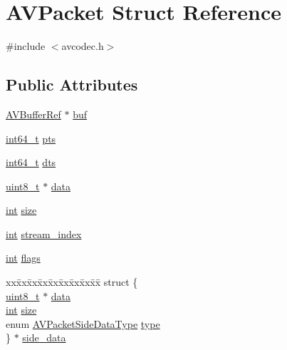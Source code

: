 \hypertarget{struct_a_v_packet}{}\section{A\+V\+Packet Struct Reference}
\label{struct_a_v_packet}


{\ttfamily \#include $<$avcodec.\+h$>$}

\subsection*{Public Attributes}
\begin{DoxyCompactItemize}
\item 
\hyperlink{struct_a_v_buffer_ref}{A\+V\+Buffer\+Ref} $\ast$ \hyperlink{struct_a_v_packet_a3bf81872813551fe9343dd0e09993e38}{buf}
\item 
\hyperlink{lib-src_2ffmpeg_2win32_2stdint_8h_a67a9885ef4908cb72ce26d75b694386c}{int64\+\_\+t} \hyperlink{struct_a_v_packet_a73bde0a37f3b1efc839f11295bfbf42a}{pts}
\item 
\hyperlink{lib-src_2ffmpeg_2win32_2stdint_8h_a67a9885ef4908cb72ce26d75b694386c}{int64\+\_\+t} \hyperlink{struct_a_v_packet_a85dbbd306b44b02390cd91c45e6a0f76}{dts}
\item 
\hyperlink{lib-src_2ffmpeg_2win32_2stdint_8h_a9a941819355e6f658991890ff66b4b0e}{uint8\+\_\+t} $\ast$ \hyperlink{struct_a_v_packet_aaf4fe58dfcc7c232c1f2268b539d8367}{data}
\item 
\hyperlink{xmltok_8h_a5a0d4a5641ce434f1d23533f2b2e6653}{int} \hyperlink{struct_a_v_packet_a4d1ea19f63eb107111fd650ca514d1f4}{size}
\item 
\hyperlink{xmltok_8h_a5a0d4a5641ce434f1d23533f2b2e6653}{int} \hyperlink{struct_a_v_packet_a0d1cb9b5a32b00fb6edc81ea3aae2a49}{stream\+\_\+index}
\item 
\hyperlink{xmltok_8h_a5a0d4a5641ce434f1d23533f2b2e6653}{int} \hyperlink{struct_a_v_packet_a437be96a9da675f12caa228a9c81bd82}{flags}
\item 
\begin{tabbing}
xx\=xx\=xx\=xx\=xx\=xx\=xx\=xx\=xx\=\kill
struct \{\\
\>\hyperlink{lib-src_2ffmpeg_2win32_2stdint_8h_a9a941819355e6f658991890ff66b4b0e}{uint8\_t} $\ast$ \hyperlink{struct_a_v_packet_aaf4fe58dfcc7c232c1f2268b539d8367}{data}\\
\>\hyperlink{xmltok_8h_a5a0d4a5641ce434f1d23533f2b2e6653}{int} \hyperlink{struct_a_v_packet_a4d1ea19f63eb107111fd650ca514d1f4}{size}\\
\>enum \hyperlink{group__lavc__packet_ga9a80bfcacc586b483a973272800edb97}{AVPacketSideDataType} \hyperlink{struct_a_v_packet_a01690f0be58299b32a1c37fb849ae724}{type}\\
\} $\ast$ \hyperlink{struct_a_v_packet_afe42dfd3da47cb717a8183c9460436d2}{side\_data}\\


\end{tabbing}
\end{DoxyCompactItemize}
